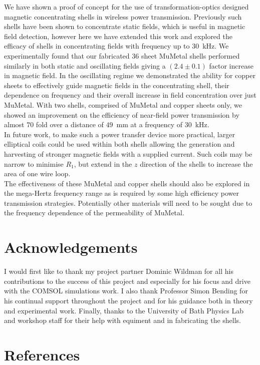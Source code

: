 \documentclass[11pt]{iopart}
\begin{document}
We have shown a proof of concept for the use of transformation-optics
designed magnetic concentrating shells in wireless power
transmission. Previously such shells have been shown to concentrate
static fields, which is useful in magnetic field detection, however here
we have extended this work and explored the efficacy of shells in
concentrating fields with frequency up to $30$~kHz. We experimentally
found that our fabricated $36$ sheet MuMetal shells performed
similarly in both static and oscillating fields giving a $(2.4\pm0.1)$
factor increase in magnetic field. In the oscillating regime we
demonstrated the ability for copper sheets to effectively guide magnetic
fields in the concentrating shell, their dependence on frequency and their
overall increase in field concentration over just MuMetal. With two
shells, comprised of MuMetal and copper sheets only, we showed an
improvement on the efficiency of near-field power transmission by
almost $70$ fold over a distance of $49$~mm at a frequency of
$30$~kHz.\\
In future work, to make such a power transfer device more practical,
larger elliptical coils could be used within both shells allowing the
generation and harvesting of stronger magnetic fields with a supplied
current. Such coils may be narrow to minimise $R_1$, but extend in the
$z$ direction of the shells to increase the area of one wire
loop.\\ The effectiveness of these MuMetal and copper shells should
also be explored in the mega-Hertz frequency range as is required by
some high efficiency power transmission
strategies\cite{Kurs2007}. Potentially other materials will need to be
sought due to the frequency dependence of the permeability of MuMetal.

\section{Acknowledgements}
I would first like to thank my project partner Dominic Wildman for all
his contributions to the success of this project and especially for
his focus and drive with the COMSOL simulations work.  I also thank
Professor Simon Bending for his continual support throughout the
project and for his guidance both in theory and experimental work.
Finally, thanks to the University of Bath Physics Lab and workshop
staff for their help with equiment and in fabricating the shells.

\section{References}




\end{document}
